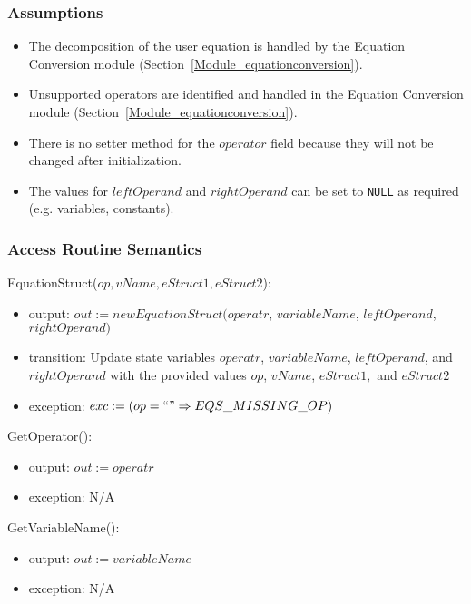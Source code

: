 \documentclass[12pt, titlepage]{article}
\begin{document}
\subsubsection{Assumptions}

\begin{itemize}
	\item The decomposition of the user equation is handled by the Equation 
	Conversion module (Section~\ref{Module_equationconversion}).
	\item Unsupported operators are identified and handled in the Equation 
	Conversion module (Section~\ref{Module_equationconversion}).
	\item There is no setter method for the $operator$ field because they will 
	not be changed after initialization.
	\item The values for $leftOperand$ and $rightOperand$ can be set to 
	\texttt{NULL} as required (e.g. variables, constants).
\end{itemize}

\subsubsection{Access Routine Semantics}

\noindent EquationStruct($op, vName, eStruct1, eStruct2$):
\begin{itemize}
	\item output: $out := new EquationStruct(operatr$, $variableName$, 
	$leftOperand$, $rightOperand)$
	\item transition: Update state variables $operatr$, $variableName$, 
	$leftOperand$, and $rightOperand$ with the provided values $op$, $vName$, 
	$eStruct1,$ and $eStruct2$
	\item exception: $exc := \\
	(op = ``" \Rightarrow EQS\_MISSING\_OP)$
\end{itemize}

\noindent GetOperator():
\begin{itemize}
	\item output: $out := operatr$
	\item exception: N/A
\end{itemize}

\noindent GetVariableName():
\begin{itemize}
	\item output: $out := variableName$
	\item exception: N/A
\end{itemize}
\end{document}
